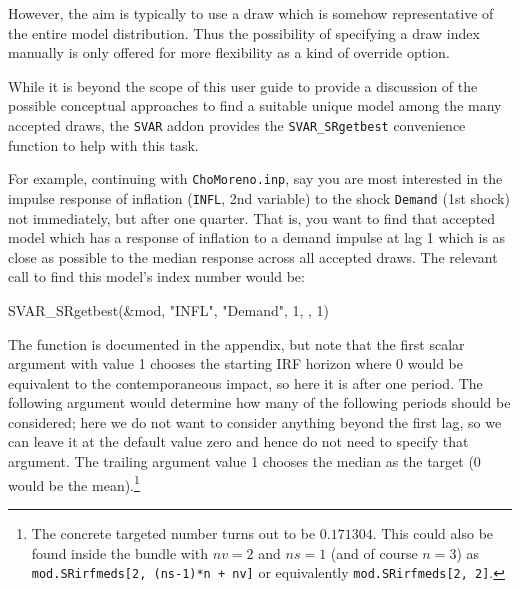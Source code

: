 \documentclass[a4paper,10pt]{article}
\begin{document}






However, the aim is typically to use a draw which is somehow representative of the entire 
model distribution. Thus the possibility of specifying a draw index manually is only offered for 
more flexibility as a kind of override option. 

While it is beyond the scope of this user guide to provide a discussion of the possible conceptual 
approaches to find a suitable unique model among the many accepted draws, the \texttt{SVAR}
addon provides the \texttt{SVAR\_SRgetbest} convenience function to help with this task.

For example, continuing with \texttt{ChoMoreno.inp}, say you are most interested in the 
impulse response of inflation (\texttt{INFL}, 2nd variable) to the shock \texttt{Demand} 
(1st shock) not immediately, but after one quarter. 
That is, you want to find that accepted model which has a 
response of inflation to a demand impulse at lag 1 which is as close as 
possible to the median response across all accepted draws. 
The relevant call to find this model's index number would be:

 \begin{code}
 SVAR_SRgetbest(&mod, "INFL", "Demand", 1, , 1) 
 \end{code}

The function is documented in the appendix, but note that the first scalar argument with value 1 
chooses the starting IRF horizon where 0 would be equivalent to the contemporaneous impact,
so here it is after one period. The following argument would determine
how many of the following periods should be considered; here we do not want to consider anything 
beyond the first lag, so we can leave it at the default value zero and hence do not need to specify 
that argument. The trailing argument value 1 chooses the median as the target (0 would be 
the mean).\footnote{The concrete targeted number turns out to be  $0.171304$. This could also 
be found inside the bundle with $nv=2$ and $ns=1$ (and of course $n=3$) as
\texttt{mod.SRirfmeds[2, (ns-1)*n + nv]} or equivalently \texttt{mod.SRirfmeds[2, 2]}.}
\end{document}
